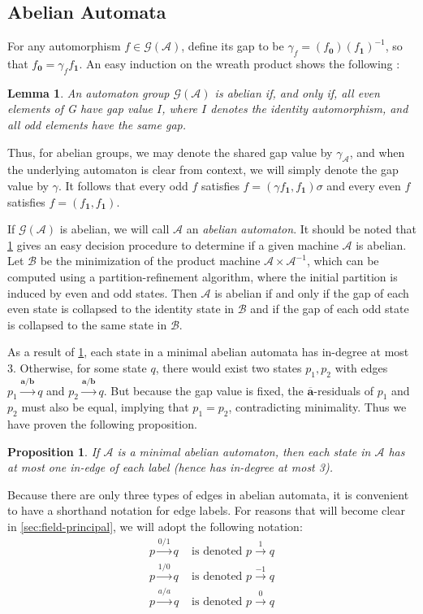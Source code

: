 \documentclass[12pt, letterpaper]{article}
\newcommand{\A}{\mathcal A}
\newcommand{\ch}[1]{\mathbf{#1}}
\newcommand{\res}[2]{{{#1}_{\ch{#2}}}}
\newcommand{\gp}{\mathcal G}
\newcommand{\f}[1]{\overline{#1}}
\newtheorem{lemma}[thm]{Lemma}
\newtheorem{prop}[thm]{Proposition}
\begin{document}
\subsection{Abelian Automata} \label{sec:abelian-automata}
For any automorphism $f \in \gp(\A)$, define its gap to be $\gamma_f =
(\res{f}{0})(\res{f}{1})^{-1}$, so that $\res{f}{0} = \gamma_f \res{f}{1}$. An
easy induction on the wreath product shows the following \cite{Okano-Thesis}:
\begin{lemma}\label{lemma:gap}
    An automaton group $\gp(\A)$ is abelian if, and only if, all even elements
    of G have gap value $I$, where $I$ denotes the identity automorphism, and
    all odd elements have the same gap.
\end{lemma}
Thus, for abelian groups, we may denote the shared gap value by $\gamma_\A$,
and when the underlying automaton is clear from context, we will simply denote
the gap value by $\gamma$.  It follows that every odd $f$ satisfies $f =
(\gamma \res{f}{1}, \res{f}{1})\sigma$ and every even $f$ satisfies $f =
(\res{f}{1}, \res{f}{1})$.

If $\gp(\A)$ is abelian, we will call $\A$ an \emph{abelian automaton}. It
should be noted that \cref{lemma:gap} gives an easy decision procedure to
determine if a given machine $\A$ is abelian. Let $\mathcal B$ be the
minimization of the product machine $\A \times \A^{-1}$, which can be computed
using a partition-refinement algorithm, where the initial partition is induced
by even and odd states. Then $\A$ is abelian if and only if the gap of each
even state is collapsed to the identity state in $\mathcal B$ and if the gap of
each odd state is collapsed to the same state in $\mathcal B$.

As a result of \cref{lemma:gap}, each state in a minimal abelian automata has
in-degree at most 3. Otherwise, for some state $q$, there would exist two
states $p_1, p_2$ with edges $p_1 \xrightarrow{\ch{a} / \ch{b}} q$ and $p_2
\xrightarrow{\ch{a} / \ch{b}} q$. But because the gap value is fixed, the
$\f{\ch{a}}$-residuals of $p_1$ and $p_2$ must also be equal, implying that
$p_1 = p_2$, contradicting minimality. Thus we have proven the following
proposition.
\begin{prop}\label{prop:in-degree-3}
    If $\A$ is a minimal abelian automaton, then each state in $\A$ has
    at most one in-edge of each label (hence has in-degree at most 3).
\end{prop}

Because there are only three types of edges in abelian automata, it is
convenient to have a shorthand notation for edge labels. For reasons
that will become clear in \cref{sec:field-principal}, we will adopt the
following notation:
\begin{align*}
    p \xrightarrow{0 / 1} q &\text{ is denoted } p \xrightarrow{1} q\\
    p \xrightarrow{1 / 0} q &\text{ is denoted } p \xrightarrow{-1} q\\
    p \xrightarrow{a / a} q &\text{ is denoted } p \xrightarrow{0} q
\end{align*}
\end{document}
